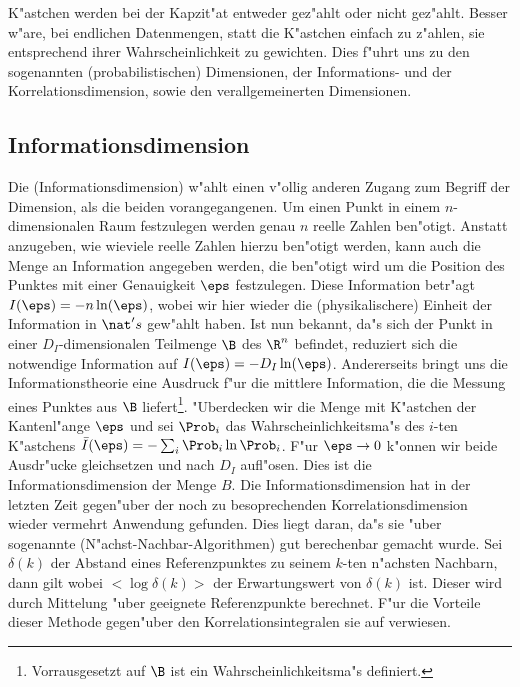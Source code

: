 K"astchen werden bei der Kapzit"at
entweder gez"ahlt oder nicht gez"ahlt. Besser w"are, bei endlichen Datenmengen, statt die
K"astchen  einfach zu z"ahlen, sie entsprechend ihrer Wahrscheinlichkeit zu
gewichten. Dies f"uhrt uns zu den sogenannten \begriff(probabilistischen) Dimensionen, der 
Informations- und der Korrelationsdimension, sowie den verallgemeinerten Dimensionen.



\subsection{Informationsdimension}
Die \begriff(Informationsdimension) w"ahlt einen v"ollig anderen Zugang zum Begriff der Dimension,
als die beiden vorangegangenen. Um einen Punkt in einem $n$-dimensionalen Raum festzulegen 
werden genau $n$ reelle Zahlen ben"otigt. Anstatt anzugeben, wie wieviele reelle Zahlen
hierzu ben"otigt werden, kann auch die Menge an Information angegeben
werden, die ben"otigt wird um die Position des Punktes mit einer Genauigkeit $\eps$
festzulegen. Diese Information betr"agt $I(\eps)=-n\ln(\eps)$, wobei wir hier wieder die
\naja(physikalischere) Einheit der Information in $\nat's$ gew"ahlt haben. Ist nun bekannt, da"s
sich der Punkt in einer $D_I$-dimensionalen Teilmenge $\B$ des $\R^n$ befindet, reduziert 
sich die notwendige Information auf $I(\eps)=-D_I\ln(\eps)$. Andererseits bringt uns die 
Informationstheorie eine Ausdruck f"ur die mittlere Information, die die Messung eines
Punktes aus $\B$ liefert\footnote{Vorrausgesetzt auf $\B$ ist ein Wahrscheinlichkeitsma"s
definiert.}. "Uberdecken wir die Menge mit K"astchen der Kantenl"ange $\eps$ und sei $\Prob_i$ 
das Wahrscheinlichkeitsma"s des $i$-ten K"astchens $\bar I(\eps)=-\sum_i \Prob_i\ln \Prob_i$. F"ur 
$\eps\to 0$ k"onnen wir beide Ausdr"ucke gleichsetzen und nach $D_I$ aufl"osen.
Dies ist die Informationsdimension der Menge $B$. Die Informationsdimension hat in der
letzten Zeit gegen"uber der noch zu besoprechenden Korrelationsdimension wieder vermehrt
Anwendung gefunden. Dies liegt daran, da"s sie "uber sogenannte
\begriff(N"achst-Nachbar-Algorithmen) gut berechenbar gemacht wurde\cite{Badii85}. Sei
$\delta(k)$ der Abstand eines Referenzpunktes zu seinem $k$-ten n"achsten Nachbarn, dann
gilt
wobei $<\log \delta(k)>$ der Erwartungswert von $\delta(k)$ ist. Dieser wird durch
Mittelung "uber geeignete Referenzpunkte berechnet. F"ur die Vorteile dieser Methode
gegen"uber den Korrelationsintegralen sie auf \cite{Liebert91} verwiesen.



